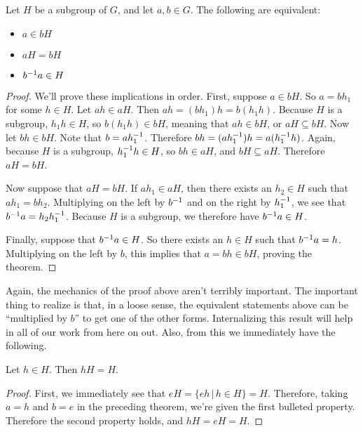 \begin{theorem}
\label{cosets}
Let $H$ be a subgroup of $G$, and let $a, b \in G$. The following are equivalent:
\begin{itemize}
\item $a \in bH$
\item $aH = bH$
\item $b^{-1}a \in H$
\end{itemize}
\end{theorem}

\begin{proof}
We'll prove these implications in order. First, suppose $a \in bH$. So $a = bh_1$ for some $h \in H$. Let $ah \in aH$. Then $ah = (bh_1)h = b(h_1 h)$. Because $H$ is a subgroup, $h_1 h \in H$, so $b(h_1 h) \in bH$, meaning that $ah \in bH$, or $aH \subseteq bH$. Now let $bh \in bH$. Note that $b = a h_1^{-1}$. Therefore $bh = (a h_1^{-1})h = a (h_1^{-1}h)$. Again, because $H$ is a subgroup, $h_1^{-1} h \in H$, so $bh \in aH$, and $bH \subseteq aH$. Therefore $aH = bH$.

Now suppose that $aH = bH$. If $ah_1 \in aH$, then there exists an $h_2 \in H$ such that $ah_1 = bh_2$. Multiplying on the left by $b^{-1}$ and on the right by $h_1^{-1}$, we see that $b^{-1}a = h_2 h_1^{-1}$. Because $H$ is a subgroup, we therefore have $b^{-1}a \in H$.

Finally, suppose that $b^{-1}a \in H$. So there exists an $h \in H$ such that $b^{-1}a = h$. Multiplying on the left by $b$, this implies that $a = bh \in bH$, proving the theorem.

\end{proof}

Again, the mechanics of the proof above aren't terribly important. The important thing to realize is that, in a loose sense, the equivalent statements above can be ``multiplied by $b$'' to get one of the other forms. Internalizing this result will help in all of our work from here on out. Also, from this we immediately have the following.

\begin{corollary}
\label{cosetcorollary}
Let $h \in H$. Then $hH = H$.
\end{corollary}

\begin{proof}
First, we immediately see that $eH = \{eh \,|\, h \in H\} = H$. Therefore, taking $a=h$ and $b=e$ in the preceding theorem, we're given the first bulleted property. Therefore the second property holds, and $hH = eH = H$.

\end{proof}

